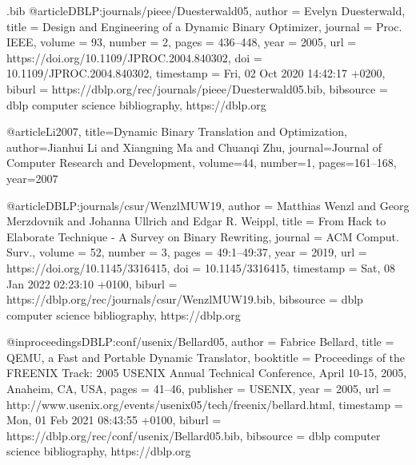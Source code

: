 \begin{filecontents}{\jobname.bib}
@article{DBLP:journals/pieee/Duesterwald05,
  author       = {Evelyn Duesterwald},
  title        = {Design and Engineering of a Dynamic Binary Optimizer},
  journal      = {Proc. {IEEE}},
  volume       = {93},
  number       = {2},
  pages        = {436--448},
  year         = {2005},
  url          = {https://doi.org/10.1109/JPROC.2004.840302},
  doi          = {10.1109/JPROC.2004.840302},
  timestamp    = {Fri, 02 Oct 2020 14:42:17 +0200},
  biburl       = {https://dblp.org/rec/journals/pieee/Duesterwald05.bib},
  bibsource    = {dblp computer science bibliography, https://dblp.org}
}

@article{Li2007,
  title={Dynamic Binary Translation and Optimization},
  author={Jianhui Li and Xiangning Ma and Chuanqi Zhu},
  journal={Journal of Computer Research and Development},
  volume={44},
  number={1},
  pages={161--168},
  year={2007}
}

@article{DBLP:journals/csur/WenzlMUW19,
  author       = {Matthias Wenzl and
                  Georg Merzdovnik and
                  Johanna Ullrich and
                  Edgar R. Weippl},
  title        = {From Hack to Elaborate Technique - {A} Survey on Binary Rewriting},
  journal      = {{ACM} Comput. Surv.},
  volume       = {52},
  number       = {3},
  pages        = {49:1--49:37},
  year         = {2019},
  url          = {https://doi.org/10.1145/3316415},
  doi          = {10.1145/3316415},
  timestamp    = {Sat, 08 Jan 2022 02:23:10 +0100},
  biburl       = {https://dblp.org/rec/journals/csur/WenzlMUW19.bib},
  bibsource    = {dblp computer science bibliography, https://dblp.org}
}

@inproceedings{DBLP:conf/usenix/Bellard05,
  author       = {Fabrice Bellard},
  title        = {QEMU, a Fast and Portable Dynamic Translator},
  booktitle    = {Proceedings of the {FREENIX} Track: 2005 {USENIX} Annual Technical
                  Conference, April 10-15, 2005, Anaheim, CA, {USA}},
  pages        = {41--46},
  publisher    = {{USENIX}},
  year         = {2005},
  url          = {http://www.usenix.org/events/usenix05/tech/freenix/bellard.html},
  timestamp    = {Mon, 01 Feb 2021 08:43:55 +0100},
  biburl       = {https://dblp.org/rec/conf/usenix/Bellard05.bib},
  bibsource    = {dblp computer science bibliography, https://dblp.org}
}

\end{filecontents}